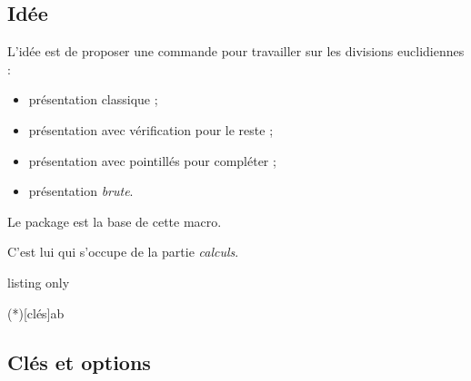 \subsection{Idée}

\begin{tipblock}
 L'idée est de proposer une commande pour travailler sur les divisions euclidiennes :

\begin{itemize}
	\item présentation classique ;
	\item présentation avec vérification pour le reste ;
	\item présentation avec pointillés pour compléter ;
	\item {} présentation \textit{brute}.
\end{itemize}
\vspace*{-\baselineskip}\leavevmode
\end{tipblock}

\begin{noteblock}
Le package  est la base de cette macro.

C'est lui qui s'occupe de la partie \textit{calculs}.
\end{noteblock}

\begin{PresCodeTexPL}{listing only}

\DivEucl(*)[clés]{a}{b}
\end{PresCodeTexPL}

\begin{PresCodePL}{}
\par
{}\par
{}\par
{}\par
{}\par
{}\par
{}\par
{}
\end{PresCodePL}

\subsection{Clés et options}


